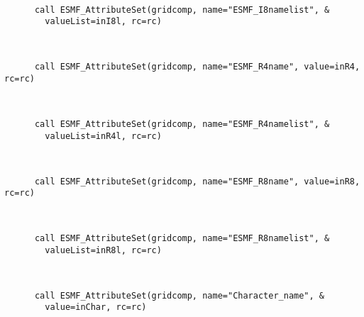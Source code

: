 
 \begin{verbatim}

      call ESMF_AttributeSet(gridcomp, name="ESMF_I8namelist", &
        valueList=inI8l, rc=rc)
 
\end{verbatim}
 

 \begin{verbatim}

      call ESMF_AttributeSet(gridcomp, name="ESMF_R4name", value=inR4, rc=rc)
 
\end{verbatim}
 

 \begin{verbatim}

      call ESMF_AttributeSet(gridcomp, name="ESMF_R4namelist", &
        valueList=inR4l, rc=rc)
 
\end{verbatim}
 

 \begin{verbatim}

      call ESMF_AttributeSet(gridcomp, name="ESMF_R8name", value=inR8, rc=rc)
 
\end{verbatim}
 

 \begin{verbatim}

      call ESMF_AttributeSet(gridcomp, name="ESMF_R8namelist", &
        valueList=inR8l, rc=rc)
 
\end{verbatim}
 

 \begin{verbatim}

      call ESMF_AttributeSet(gridcomp, name="Character_name", &
        value=inChar, rc=rc)
 
\end{verbatim}
 

